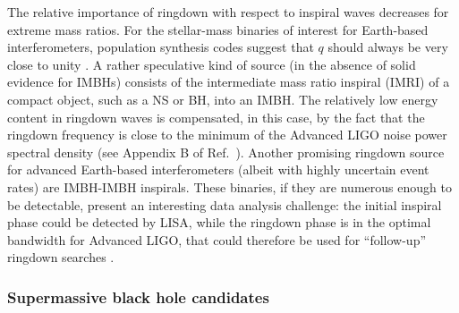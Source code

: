 \documentclass[]{iopart}
\begin{document}
The relative importance of ringdown with respect to inspiral waves decreases
for extreme mass ratios. For the stellar-mass binaries of interest for
Earth-based interferometers, population synthesis codes suggest that $q$
should always be very close to unity \cite{Belczynski:2007xg}. A rather
speculative kind of source (in the absence of solid evidence for IMBHs)
consists of the intermediate mass ratio inspiral (IMRI) of a compact object,
such as a NS or BH, into an IMBH. The relatively low energy content in
ringdown waves is compensated, in this case, by the fact that the ringdown
frequency is close to the minimum of the Advanced LIGO noise power spectral
density (see Appendix B of Ref.~\cite{Mandel:2007hi}). Another promising
ringdown source for advanced Earth-based interferometers (albeit with highly
uncertain event rates) are IMBH-IMBH inspirals. These binaries, if they are
numerous enough to be detectable, present an interesting data analysis
challenge: the initial inspiral phase could be detected by LISA, while the
ringdown phase is in the optimal bandwidth for Advanced LIGO, that could
therefore be used for ``follow-up'' ringdown searches \cite{Fregeau:2006yz}.

\subsubsection*{Supermassive black hole candidates} 
\end{document}
